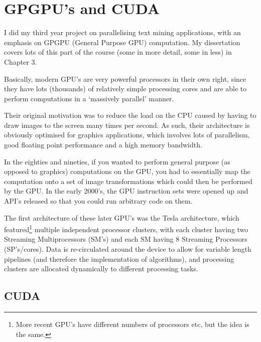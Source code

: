 
\section{GPGPU's and CUDA}


I did my third year project on parallelising text mining applications,
with an emphasis on GPGPU (General Purpose GPU) computation. My
dissertation covers lots of this part of the course (some in more
detail, some in less) in Chapter 3.

Basically, modern GPU's are very powerful processors in their own
right, since they have lots (thousands) of relatively simple
processing cores and are able to perform computations in a `massively
parallel' manner.

Their original motivation was to reduce the load on the CPU caused by
having to draw images to the screen many times per second. As such,
their architecture is obviously optimised for graphics applications,
which involves lots of parallelism, good floating point performance
and a high memory bandwidth.

In the eighties and nineties, if you wanted to perform general purpose
(as opposed to graphics) computations on the GPU, you had to
essentially map the computation onto a set of image transformations
which could then be performed by the GPU. In the early 2000's, the GPU
instruction sets were opened up and API's released so that you could
run arbitrary code on them.


The first architecture of these later GPU's was the Tesla
architecture, which featured\footnote{More recent GPU's have different
numbers of processors etc, but the idea is the same.} multiple
independent processor clusters, with each cluster having two Streaming
Multiprocessors (SM's) and each SM having 8 Streaming Processors
(SP's/cores). Data is re-circulated around the device to allow for
variable length pipelines (and therefore the implementation of
algorithms), and processing clusters are allocated dynamically to
different processing tasks.

\subsection{CUDA}

